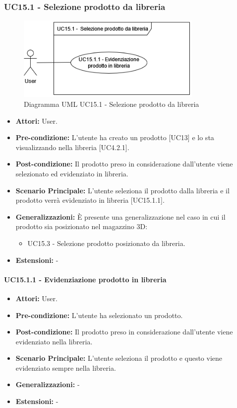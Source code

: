 \subsubsection{UC15.1 - Selezione prodotto da libreria}
\begin{figure}[H]
  \centering
  \includegraphics[width=0.8\textwidth]{UC_diagrams_11-20/UC15.1.drawio.png}
   \caption{Diagramma UML UC15.1 - Selezione prodotto da libreria}
\end{figure}
\begin{itemize}
    \item \textbf{Attori:} User.
    \item \textbf{Pre-condizione:}  L'utente ha creato un prodotto [UC13] e lo sta visualizzando nella libreria [UC4.2.1].
    \item \textbf{Post-condizione:} Il prodotto preso in considerazione dall'utente viene selezionato ed evidenziato in libreria.
    \item \textbf{Scenario Principale:} L'utente seleziona il prodotto dalla libreria e il prodotto verrà evidenziato in libreria [UC15.1.1].
    \item \textbf{Generalizzazioni:} È presente una generalizzazione nel caso in cui il prodotto sia posizionato nel magazzino 3D:
    \begin{itemize}
        \item UC15.3 - Selezione prodotto posizionato da libreria.
    \end{itemize}
    \item \textbf{Estensioni:} -
\end{itemize}


\paragraph{UC15.1.1 - Evidenziazione prodotto in libreria}
\begin{itemize}
    \item \textbf{Attori:} User.
    \item \textbf{Pre-condizione:}  L'utente ha selezionato un prodotto.
    \item \textbf{Post-condizione:} Il prodotto preso in considerazione dall'utente viene evidenziato nella libreria.
    \item \textbf{Scenario Principale:} L'utente seleziona il prodotto e questo viene evidenziato sempre nella libreria.
    \item \textbf{Generalizzazioni:} -
    \item \textbf{Estensioni:} -
\end{itemize}


